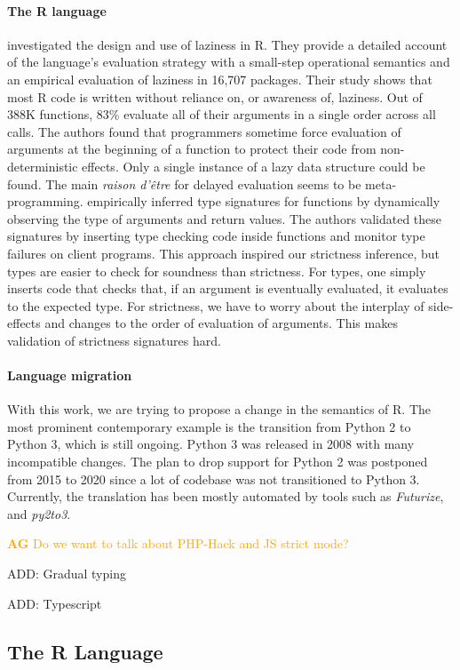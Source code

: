 \documentclass[review,nonacm,screen,acmsmall,anonymous=true]{acmart}
\newcommand{\authorcomment}[3]{\xspace\textcolor{#1}{{\bf #2} #3}\xspace}
\newcommand{\AG}[1]{\authorcomment{orange}{AG}{#1}}
\begin{document}
\paragraph{The R language} \citet{oopsla19b} investigated the design and use of
laziness in R. They provide a detailed account of the language's evaluation
strategy with a small-step operational semantics and an empirical evaluation of
laziness in 16,707 packages. Their study shows that most R code is written
without reliance on, or awareness of, laziness. Out of 388K functions, 83\%
evaluate all of their arguments in a single order across all calls. The authors
found that programmers sometime force evaluation of arguments at the beginning
of a function to protect their code from non-deterministic effects. Only a
single instance of a lazy data structure could be found. The main \emph{raison
d'\^etre} for delayed evaluation seems to be meta-programming. \citet{oopsla20b}
empirically inferred type signatures for functions by dynamically observing the
type of arguments and return values. The authors validated these signatures by
inserting type checking code inside functions and monitor type failures on
client programs. This approach inspired our strictness inference, but types are
easier to check for soundness than strictness. For types, one simply inserts
code that checks that, if an argument is eventually evaluated, it evaluates to
the expected type. For strictness, we have to worry about the interplay of
side-effects and changes to the order of evaluation of arguments. This makes
validation of strictness signatures hard.

\paragraph{Language migration}
With this work, we are trying to propose a change in the semantics of R. The
most prominent contemporary example is the transition from Python 2 to Python 3,
which is still ongoing. Python 3 was released in 2008 with many incompatible
changes. The plan \cite{pysunset} to drop support for Python 2 was postponed
from 2015 to 2020 since a lot of codebase was not transitioned to Python 3.
Currently, the translation has been mostly automated by tools such as
\emph{Futurize}, and \emph{py2to3}.

\AG{Do we want to talk about PHP-Hack and JS strict mode?}

ADD: Gradual typing

ADD: Typescript


\subsection{The R Language}
\end{document}
